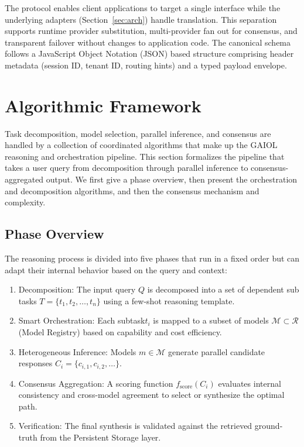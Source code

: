 \documentclass{iopjournal}
\begin{document}
The protocol enables client applications to target a single interface while the underlying adapters (Section~\ref{sec:arch}) handle translation. This separation supports runtime provider substitution, multi-provider fan out for consensus, and transparent failover without changes to application code. The canonical schema follows a JavaScript Object Notation (JSON) based structure comprising header metadata (session ID, tenant ID, routing hints) and a typed payload envelope.

\section{Algorithmic Framework}
\label{sec:algo}

Task decomposition, model selection, parallel inference, and consensus are handled by a collection of coordinated algorithms that make up the GAIOL reasoning and orchestration pipeline. This section formalizes the pipeline that takes a user query from decomposition through parallel inference to consensus-aggregated output. We first give a phase overview, then present the orchestration and decomposition algorithms, and then the consensus mechanism and complexity.

\subsection{Phase Overview}

The reasoning process is divided into five phases that run in a fixed order but can adapt their internal behavior based on the query and context:

\begin{enumerate}
    \item Decomposition: The input query $Q$ is decomposed into a set of dependent sub tasks $T = \{t_1, t_2, \ldots, t_n\}$ using a few-shot reasoning template.
    \item Smart Orchestration: Each subtask$t_i$ is mapped to a subset of models $\mathcal{M} \subset \mathcal{R}$ (Model Registry) based on capability and cost efficiency.
    \item Heterogeneous Inference: Models $m \in \mathcal{M}$ generate parallel candidate responses $C_i = \{c_{i,1}, c_{i,2}, \ldots\}$.
    \item Consensus Aggregation: A scoring function $f_{\text{score}}(C_i)$ evaluates internal consistency and cross-model agreement to select or synthesize the optimal path.
    \item Verification: The final synthesis is validated against the retrieved ground-truth from the Persistent Storage layer.
\end{enumerate}
\end{document}
